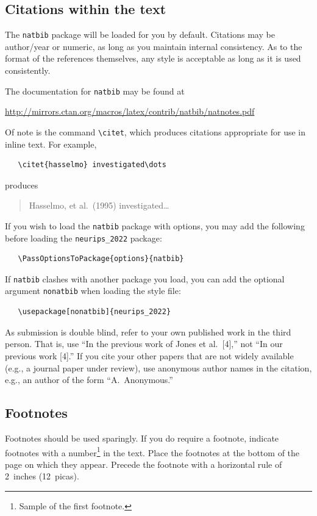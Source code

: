 \documentclass{article}
\begin{document}
\subsection{Citations within the text}


The \verb+natbib+ package will be loaded for you by default.  Citations may be
author/year or numeric, as long as you maintain internal consistency.  As to the
format of the references themselves, any style is acceptable as long as it is
used consistently.


The documentation for \verb+natbib+ may be found at
\begin{center}
  \url{http://mirrors.ctan.org/macros/latex/contrib/natbib/natnotes.pdf}
\end{center}
Of note is the command \verb+\citet+, which produces citations appropriate for
use in inline text.  For example,
\begin{verbatim}
   \citet{hasselmo} investigated\dots
\end{verbatim}
produces
\begin{quote}
  Hasselmo, et al.\ (1995) investigated\dots
\end{quote}


If you wish to load the \verb+natbib+ package with options, you may add the
following before loading the \verb+neurips_2022+ package:
\begin{verbatim}
   \PassOptionsToPackage{options}{natbib}
\end{verbatim}


If \verb+natbib+ clashes with another package you load, you can add the optional
argument \verb+nonatbib+ when loading the style file:
\begin{verbatim}
   \usepackage[nonatbib]{neurips_2022}
\end{verbatim}


As submission is double blind, refer to your own published work in the third
person. That is, use ``In the previous work of Jones et al.\ [4],'' not ``In our
previous work [4].'' If you cite your other papers that are not widely available
(e.g., a journal paper under review), use anonymous author names in the
citation, e.g., an author of the form ``A.\ Anonymous.''


\subsection{Footnotes}


Footnotes should be used sparingly.  If you do require a footnote, indicate
footnotes with a number\footnote{Sample of the first footnote.} in the
text. Place the footnotes at the bottom of the page on which they appear.
Precede the footnote with a horizontal rule of 2~inches (12~picas).
\end{document}
